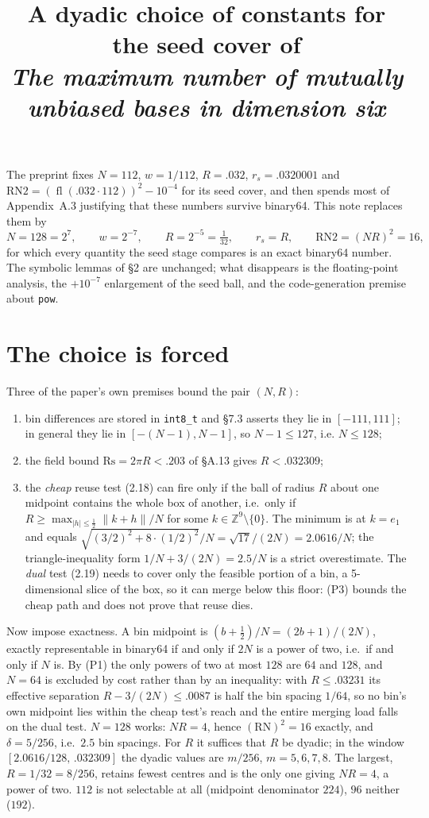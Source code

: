 \documentclass[11pt]{article}
\title{A dyadic choice of constants for the seed cover of\\ \emph{The maximum number of
mutually unbiased bases in dimension six}}
\author{}
\date{}
\newcommand{\fl}{\operatorname{fl}}
\begin{document}
\maketitle

\noindent
The preprint fixes $N=112$, $w=1/112$, $R=.032$, $r_s=.0320001$ and
$\mathrm{RN2}=(\fl(.032\cdot112))^2-10^{-4}$ for its seed cover, and then spends most of
Appendix~A.3 justifying that these numbers survive binary64. This note replaces them by
\[
  N=128=2^7,\qquad w=2^{-7},\qquad R=2^{-5}=\tfrac1{32},\qquad r_s=R,\qquad
  \mathrm{RN2}=(NR)^2=16,
\]
for which every quantity the seed stage compares is an exact binary64 number. The symbolic
lemmas of \S2 are unchanged; what disappears is the floating-point analysis, the $+10^{-7}$
enlargement of the seed ball, and the code-generation premise about \texttt{pow}.

\section{The choice is forced}

Three of the paper's own premises bound the pair $(N,R)$:
\begin{enumerate}
\item[(P1)] bin differences are stored in \texttt{int8\_t} and \S7.3 asserts they lie in
  $[-111,111]$; in general they lie in $[-(N-1),N-1]$, so $N-1\le 127$, i.e. $N\le 128$;
\item[(P2)] the field bound $\mathrm{Rs}=2\pi R<.203$ of \S A.13 gives $R<.032309$;
\item[(P3)] the \emph{cheap} reuse test (2.18) can fire only if the ball of radius $R$ about one
  midpoint contains the whole box of another, i.e.\ only if
  $R\ge\max_{|h|\le\frac12}\|k+h\|/N$ for some $k\in\mathbb Z^9\setminus\{0\}$. The minimum is at
  $k=e_1$ and equals $\sqrt{(3/2)^2+8\cdot(1/2)^2}/N=\sqrt{17}/(2N)=2.0616/N$; the
  triangle-inequality form $1/N+3/(2N)=2.5/N$ is a strict overestimate. The \emph{dual} test (2.19)
  needs to cover only the feasible portion of a bin, a 5-dimensional slice of the box, so it can
  merge below this floor: (P3) bounds the cheap path and does not prove that reuse dies.
\end{enumerate}
Now impose exactness. A bin midpoint is $(b+\tfrac12)/N=(2b+1)/(2N)$, exactly representable in
binary64 if and only if $2N$ is a power of two, i.e.\ if and only if $N$ is. By (P1) the only powers
of two at most $128$ are $64$ and $128$, and $N=64$ is excluded by cost rather than by an
inequality: with $R\le.03231$ its effective separation $R-3/(2N)\le.0087$ is half the bin spacing
$1/64$, so no bin's own midpoint lies within the cheap test's reach and the entire merging load
falls on the dual test. $N=128$ works: $NR=4$, hence $(\mathrm{RN})^2=16$ exactly, and
$\delta=5/256$, i.e.\ $2.5$ bin spacings. For $R$ it suffices that $R$ be dyadic; in the window
$[2.0616/128,\,.032309]$ the dyadic values are $m/256$, $m=5,6,7,8$. The largest, $R=1/32=8/256$,
retains fewest centres and is the only one giving $NR=4$, a power of two. $112$ is not selectable at
all (midpoint denominator $224$), $96$ neither ($192$).
\end{document}
